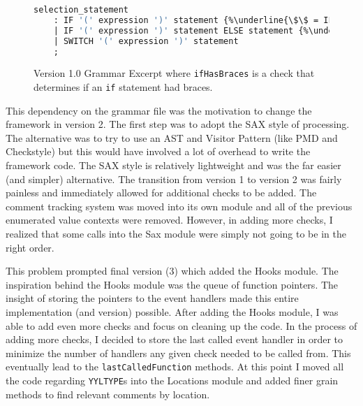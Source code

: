 \documentclass[12pt]{report}
\begin{document}
\begin{figure}
\begin{lstlisting}[language=Caml, escapechar=\%]
selection_statement
	: IF '(' expression ')' statement {%\underline{\$\$ = IF\_SELECTION;}% ifHasBraces($5, @$);}
	| IF '(' expression ')' statement ELSE statement {%\underline{\$\$ = IF\_ELSE\_SELECTION;}% ifHasBraces($5, @$); ifHasBraces($7, @$);}
	| SWITCH '(' expression ')' statement
	;
\end{lstlisting}
\caption[Version 1.0 Grammar Excerpt]{Version 1.0 Grammar Excerpt where \lstinline{ifHasBraces} is a check that determines if an \lstinline{if} statement had braces.}
\label{1.0grammar}
\end{figure}

This dependency on the grammar file was the motivation to change the framework in version 2. The first 
step was to adopt the SAX style of processing. The alternative was to try to use an AST and Visitor 
Pattern (like PMD and Checkstyle) but this would have involved a lot of overhead to write the framework 
code. The SAX style is relatively lightweight and was the far easier (and simpler) alternative. The 
transition from version 1 to version 2 was fairly painless and immediately allowed for additional checks to 
be added. The comment tracking system was moved into its own module and all of the previous 
enumerated value contexts were removed. However, in adding more checks, I realized that some calls 
into the Sax module were simply not going to be in the right order. 

This problem prompted final version (3) which added the Hooks module. The inspiration behind the 
Hooks module was the queue of function pointers. The insight of storing the pointers to the event 
handlers made this entire implementation (and version) possible. After adding the Hooks module, I was 
able to add even more checks and focus on cleaning up the code. In the process of adding more checks, 
I decided to store the last called event handler in order to minimize the number of handlers any given 
check needed to be called from. This eventually lead to the \lstinline{lastCalledFunction} methods.  At 
this point I moved all the code regarding \lstinline{YYLTYPE}s into the Locations module and added finer 
grain methods to find relevant comments by location. 

\singlespacing
\nocite{*}

\clearpage
{}
{}

\end{document}
